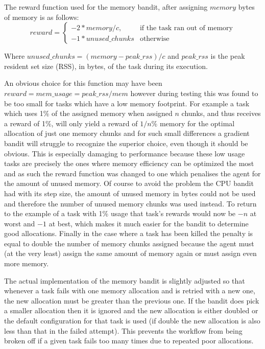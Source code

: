 The reward function used for the memory bandit, after assigning $memory$ bytes of memory is as follows:
\[ reward = 
\begin{cases}
    -2*memory/c,& \text{if the task ran out of memory}\\
    -1 * unused\_chunks              & \text{otherwise}
\end{cases}
\]

Where $unused\_chunks = (memory - peak\_rss) / c$ and $peak\_rss$ is the peak resident set size (RSS), in bytes, of the task during its execution.

An obvious choice for this function may have been $reward = mem\_usage = peak\_rss/mem$ however during testing this was found to be too small for tasks which have a low memory footprint. For example a task which uses 1\% of the assigned memory when assigned $n$ chunks, and thus receives a reward of 1\%, will only yield a reward of $1/n$\% memory for the optimal allocation of just one memory chunks and for such small differences a gradient bandit will struggle to recognize the superior choice, even though it should be obvious. This is especially damaging to performance because these low usage tasks are precisely the ones where memory efficiency can be optimized the most and as such the reward function was changed to one which penalises the agent for the amount of unused memory. Of course to avoid the problem the CPU bandit had with its step size, the amount of unused memory in bytes could not be used and therefore the number of unused memory chunks was used instead. To return to the example of a task with 1\% usage that task’s rewards would now be $-n$ at worst and $-1$ at best, which makes it much easier for the bandit to determine good allocations. Finally in the case where a task has been killed the penalty is equal to double the number of memory chunks assigned because the agent must (at the very least) assign the same amount of memory again or must assign even more memory.

The actual implementation of the memory bandit is slightly adjusted so that whenever a task fails with one memory allocation and is retried with a new one, the new allocation must be greater than the previous one. If the bandit does pick a smaller allocation then it is ignored and the new allocation is either doubled or the default configuration for that task is used (if double the new allocation is also less than that in the failed attempt). This prevents the workflow from being broken off if a given task fails too many times due to repeated poor allocations.

